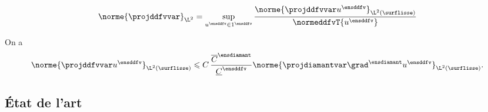 \begin{demo}
\[
\norme{\projddfvvar}_{\L^2} = \sup_{u^\ensddfv \in \R^\ensddfv} \frac{\norme{\projddfvvar u^\ensddfv}_{\L^2(\surflisse)}}{\normeddfvT{u^\ensddfv}}
\]
\end{demo}

\begin{corol}
On a
\[
\norme{\projddfvvar u^\ensddfv}_{\L^2(\surflisse)} \leqslant C \, \frac{\overline{C}^\ensdiamant}{\underline{C}^\ensddfv} \norme{\projdiamantvar \grad^\ensdiamant u^\ensddfv}_{\L^2(\surflisse)}.
\]
\end{corol}


\subsection{État de l'art}